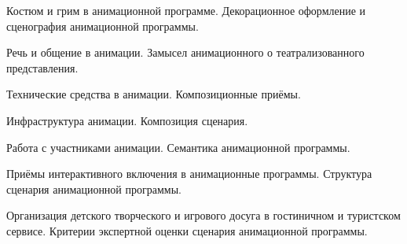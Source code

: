 \documentclass[
	14pt,
	a4paper,
	]
	{scrartcl}
\begin{document}
\vfill

\newpage


\shapk
{}
\setcounter{zad}{0}

\vfill
\z Костюм и грим в анимационной программе.
 \vfill
\z Декорационное оформление и сценография анимационной программы.
 \vfill

\vfill

\newpage


\shapk
{}
\setcounter{zad}{0}

\vfill
\z Речь и общение в анимации.
 \vfill
\z Замысел анимационного о театрализованного представления.
 \vfill

\vfill

\newpage


\shapk
{}
\setcounter{zad}{0}

\vfill
\z Технические средства в анимации.
 \vfill
\z Композиционные приёмы.
 \vfill

\vfill

\newpage


\shapk
{}
\setcounter{zad}{0}

\vfill
\z Инфраструктура анимации.
 \vfill
\z Композиция сценария. 
 \vfill

\vfill

\newpage


\shapk
{}
\setcounter{zad}{0}

\vfill
\z Работа с участниками анимации.
 \vfill
\z Семантика анимационной программы.
 \vfill

\vfill

\newpage


\shapk
{}
\setcounter{zad}{0}

\vfill
\z Приёмы интерактивного включения в анимационные программы.
 \vfill
\z Структура сценария анимационной программы.
 \vfill

\vfill

\newpage


\shapk
{}
\setcounter{zad}{0}

\vfill
\z Организация детского творческого и игрового досуга в гостиничном и туристском сервисе.
 \vfill
\z Критерии экспертной оценки сценария анимационной программы. 
 \vfill

\vfill

\newpage


\shapk
{}
\setcounter{zad}{0}
\end{document}
